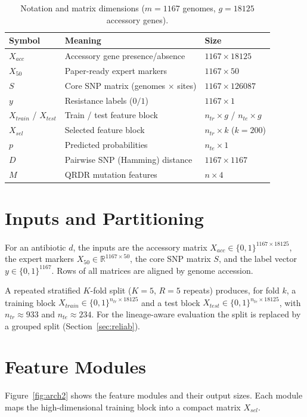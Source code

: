 \documentclass[../main.tex]{subfiles}
\begin{document}
\begin{table}[H]
\centering
\caption{Notation and matrix dimensions ($m=1167$ genomes, $g=18125$ accessory genes).}
\label{tab:notation}
\begin{tabular}{lll}
\hline
Symbol & Meaning & Size \\ \hline
$X_{acc}$ & Accessory gene presence/absence & $1167 \times 18125$ \\
$X_{50}$ & Paper-ready expert markers & $1167 \times 50$ \\
$S$ & Core SNP matrix (genomes $\times$ sites) & $1167 \times 126087$ \\
$y$ & Resistance labels ($0/1$) & $1167 \times 1$ \\
$X_{train}$ / $X_{test}$ & Train / test feature block & $n_{tr}\times g$ / $n_{te}\times g$ \\
$X_{sel}$ & Selected feature block & $n_{tr}\times k$ ($k{=}200$) \\
$p$ & Predicted probabilities & $n_{te}\times 1$ \\
$D$ & Pairwise SNP (Hamming) distance & $1167\times 1167$ \\
$M$ & QRDR mutation features & $n\times 4$ \\ \hline
\end{tabular}
\end{table}

\section{Inputs and Partitioning}

For an antibiotic $d$, the inputs are the accessory matrix $X_{acc}\in\{0,1\}^{1167\times 18125}$, the expert markers $X_{50}\in\mathbb{R}^{1167\times 50}$, the core SNP matrix $S$, and the label vector $y\in\{0,1\}^{1167}$. Rows of all matrices are aligned by genome accession.

A repeated stratified $K$-fold split ($K=5$, $R=5$ repeats) produces, for fold $k$, a training block $X_{train}\in\{0,1\}^{n_{tr}\times 18125}$ and a test block $X_{test}\in\{0,1\}^{n_{te}\times 18125}$, with $n_{tr}\approx 933$ and $n_{te}\approx 234$. For the lineage-aware evaluation the split is replaced by a grouped split (Section~\ref{sec:reliab}).

\section{Feature Modules}

Figure~\ref{fig:arch2} shows the feature modules and their output sizes. Each module maps the high-dimensional training block into a compact matrix $X_{sel}$.
\end{document}
